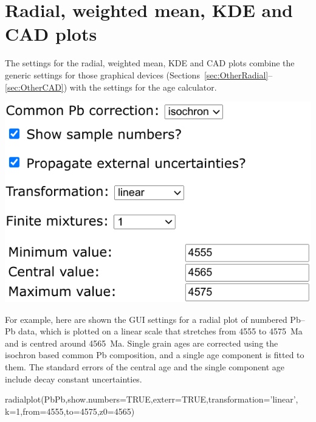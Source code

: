 \begin{refsection}
\begin{enumerate}
\end{enumerate}

\section{Radial, weighted mean, KDE and CAD plots}
\label{sec:ThPbPbOtherPlots}

The settings for the radial, weighted mean, KDE and CAD plots combine
the generic settings for those graphical devices
(Sections~\ref{sec:OtherRadial}--\ref{sec:OtherCAD}) with the settings
for the age calculator.\\

\noindent\begin{minipage}[t]{.45\linewidth}
\strut\vspace*{-\baselineskip}\newline
\includegraphics[width=\linewidth]{../figures/PbPbRadialOptions.png}
\end{minipage}
\begin{minipage}[t]{.55\linewidth}
  For example, here are shown the GUI settings for a radial plot of
  numbered Pb--Pb data, which is plotted on a linear scale that
  stretches from 4555 to 4575~Ma and is centred around 4565~Ma. Single
  grain ages are corrected using the isochron based common Pb
  composition, and a single age component is fitted to them. The
  standard errors of the central age and the single component age
  include decay constant uncertainties.
\end{minipage}

\begin{console}
radialplot(PbPb,show.numbers=TRUE,exterr=TRUE,transformation='linear',
           k=1,from=4555,to=4575,z0=4565)
\end{console}


\end{refsection}
